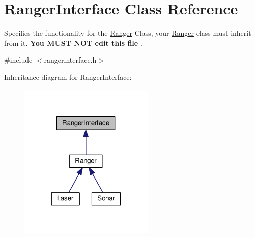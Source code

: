 \hypertarget{classRangerInterface}{}\section{Ranger\+Interface Class Reference}
\label{classRangerInterface}


Specifies the functionality for the \hyperlink{classRanger}{Ranger} Class, your \hyperlink{classRanger}{Ranger} class must inherit from it. {\bfseries  You M\+U\+ST N\+OT edit this file }.  




{\ttfamily \#include $<$rangerinterface.\+h$>$}



Inheritance diagram for Ranger\+Interface\+:
\nopagebreak
\begin{figure}[H]
\begin{center}
\leavevmode
\includegraphics[width=182pt]{classRangerInterface__inherit__graph}
\end{center}
\end{figure}
